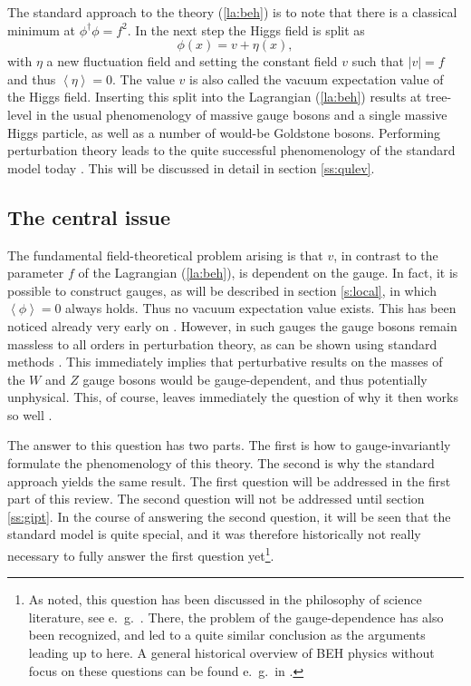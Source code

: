 \documentclass[final,twoside,12pt]{article}
\newcommand*{\no}{\noindent}
\newcommand*{\be}{\begin{equation}}
\newcommand*{\ee}{\end{equation}}
\newcommand*{\pref}[1]{(\ref{#1})}
\newcommand*{\1}{1\!\!\!\bot}
\newcommand*{\la}{\left\langle}
\newcommand*{\ra}{\right\rangle}
\begin{document}
The standard approach to the theory \pref{la:beh} \cite{Bohm:2001yx,Weinberg:1996kr} is to note that there is a classical minimum at $\phi^\dagger\phi=f^2$. In the next step the Higgs field is split as 
\be
\phi(x)=v+\eta(x)\label{split},
\ee
\no with $\eta$ a new fluctuation field and setting the constant field $v$ such that $|v|=f$ and thus $\la\eta\ra=0$. The value $v$ is also called the vacuum expectation value of the Higgs field. Inserting this split into the Lagrangian \pref{la:beh} results at tree-level in the usual phenomenology of massive gauge bosons and a single massive Higgs particle, as well as a number of would-be Goldstone bosons. Performing perturbation theory leads to the quite successful phenomenology of the standard model today \cite{pdg}. This will be discussed in detail in section \ref{ss:qulev}.

\subsection{The central issue}

The fundamental field-theoretical problem arising is that $v$, in contrast to the parameter $f$ of the Lagrangian \pref{la:beh}, is dependent on the gauge. In fact, it is possible to construct gauges, as will be described in section \ref{s:local}, in which $\la\phi\ra=0$ always holds. Thus no vacuum expectation value exists. This has been noticed already very early on \cite{Lee:1974zg}. However, in such gauges the gauge bosons remain massless to all orders in perturbation theory, as can be shown using standard methods \cite{Bohm:2001yx}. This immediately implies that perturbative results on the masses of the $W$ and $Z$ gauge bosons would be gauge-dependent, and thus potentially unphysical. This, of course, leaves immediately the question of why it then works so well \cite{pdg}.

The answer to this question has two parts. The first is how to gauge-invariantly formulate the phenomenology of this theory. The second is why the standard approach yields the same result. The first question will be addressed in the first part of this review. The second question will not be addressed until section \ref{ss:gipt}. In the course of answering the second question, it will be seen that the standard model is quite special, and it was therefore historically not really necessary to fully answer the first question yet\footnote{As noted, this question has been discussed in the philosophy of science literature, see e.\ g.\ \cite{Lyre:2008af,Francois:2017aa}. There, the problem of the gauge-dependence has also been recognized, and led to a quite similar conclusion as the arguments leading up to here. A general historical overview of BEH physics without focus on these questions can be found e.\ g.\ in \cite{Borrelli:2015goa}.}.
\end{document}
